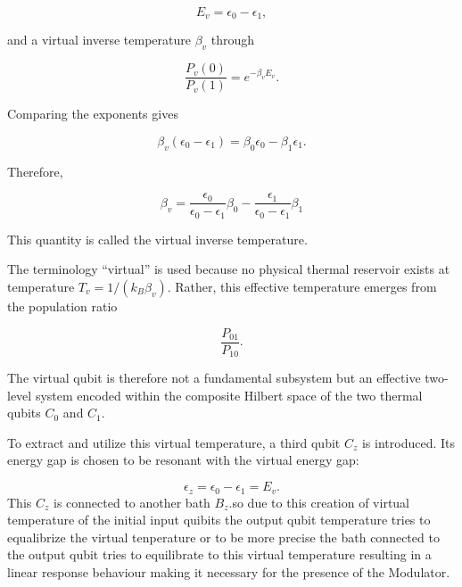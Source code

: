 \documentclass[11pt,a4paper]{article}
\theoremstyle{definition}
\theoremstyle{remark}
\begin{document}
\[
E_v=\epsilon_0-\epsilon_1,
\]

and a virtual inverse temperature \(\beta_v\) through

\[
\frac{P_v(0)}{P_v(1)}
=
e^{-\beta_v E_v}.
\]

Comparing the exponents gives

\[
\beta_v(\epsilon_0-\epsilon_1)
=
\beta_0\epsilon_0-\beta_1\epsilon_1.
\]

Therefore,

\[
\beta_v
=
\frac{\epsilon_0}{\epsilon_0 -\epsilon_1}\beta_0 - \frac{\epsilon_1}{\epsilon_0 -\epsilon_1}\beta_1
\]

This quantity is called the virtual inverse temperature.

The terminology ``virtual'' is used because no physical thermal reservoir exists at temperature \(T_v=1/(k_B\beta_v)\). Rather, this effective temperature emerges from the population ratio

\[
\frac{P_{01}}{P_{10}}.
\]

The virtual qubit is therefore not a fundamental subsystem but an effective two-level system encoded within the composite Hilbert space of the two thermal qubits \(C_0\) and \(C_1\).

To extract and utilize this virtual temperature, a third qubit \(C_z\) is introduced. Its energy gap is chosen to be resonant with the virtual energy gap:

\[
\epsilon_z
=
\epsilon_0-\epsilon_1
=
E_v.
\]
This \(C_z\) is connected to another bath \(B_z\).so due to this creation of virtual temperature of the initial input quibits the output qubit temperature tries to equalibrize the virtual tenperature or to be more precise the bath connected to the output qubit tries to equilibrate to this virtual temperature resulting in a linear response behaviour making it necessary for the presence of the Modulator.
\end{document}
